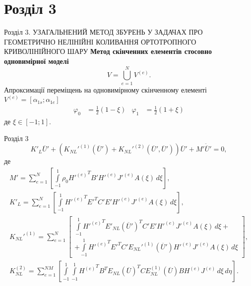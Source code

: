 \documentclass[8pt]{beamer}
\numberwithin{figure}{section}
\numberwithin{equation}{section}
\numberwithin{table}{section}
\begin{document}
\section{Розділ 3}
\begin{frame}{Розділ 3. УЗАГАЛЬНЕНИЙ МЕТОД ЗБУРЕНЬ У ЗАДАЧАХ ПРО ГЕОМЕТРИЧНО НЕЛІНІЙНІ КОЛИВАННЯ ОРТОТРОПНОГО КРИВОЛІНІЙНОГО ШАРУ}
\textbf{Метод скінченних елементів стосовно одновимірної моделі}
\\
\vspace{1em}
\begin{equation}
V=\bigcup\limits_{e=1}^{N} V^{(e)}.
\end{equation}
Апроксимації переміщень на одновимірному скінченному елементі $V^{(e)} = [\alpha_{1s};\alpha_{1e}]$
\begin{equation}
\begin{aligned}
\varphi_0&=\frac{1}{2}\left(1-\xi\right) & \varphi_1 &=\frac{1}{2}\left(1+\xi\right)
\end{aligned}
\end{equation}
де $\xi \in [-1;1]$.
\end{frame}

\begin{frame}{Розділ 3}
\begin{equation}\label{eq:ode_fem}
K'_L\overline{U}'+\left( K_{NL}'^{(1)}\left( \overline{U}'\right)+K_{NL}'^{(2)}\left( \overline{U}',\overline{U}'\right) \right)\overline{U}'+M'\ddot{\overline{U}}'=0,
\end{equation}
де 
\begin{gather}
M'=\sum_{e=1}^{N}
\left[ \int\limits_{-1}^{1} \rho_0 {H'^{(e)}}^T B' H'^{(e)} J'^{(e)} A\left(\xi\right) \, d\xi \right],\\
K'_L=\sum_{e=1}^{N}
\left[ \int\limits_{-1}^{1}{H'^{(e)}}^T E'^T C' E' H'^{(e)} J'^{(e)} A\left(\xi\right) \, d\xi \right],\\
K_{NL}'^{(1)}=\sum_{e=1}^{N}
\left[ 
\begin{aligned}
\int\limits_{-1}^{1} {H'^{(e)}}^T E'_{NL}\left( \overline{U}'\right)^T C' E' H'^{(e)} J'^{(e)} A\left(\xi\right) \, d\xi  + \\ 
+ \int\limits_{-1}^{1} {H'^{(e)}}^T E'^T C' E_{NL}'^{(1)}\left( \overline{U}'\right) H'^{(e)} J'^{(e)} A\left(\xi\right) \, d\xi 
\end{aligned} 
\right],\\
K_{NL}^{(2)}=\sum_{e=1}^{NM}
\left[ 
\int\limits_{-1}^{1} \int\limits_{-1}^{1} {H^{(e)}}^T B^T E_{NL}\left( \overline{U}\right)^T C E_{NL}^{(1)}\left( \overline{U}\right) B H^{(e)} J^{(e)} \, d\xi \, d\eta 
\right].
\end{gather}

\end{frame}
\end{document}
